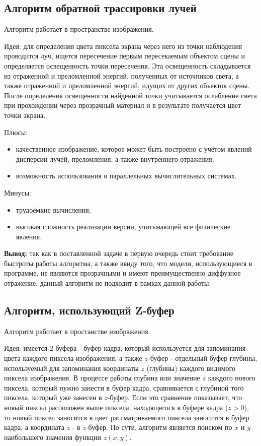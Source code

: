\subsection{Алгоритм обратной трассировки лучей}
Алгоритм работает в пространстве изображения.

Идея: для определения цвета пиксела экрана через него из точки наблюдения проводится луч, ищется пересечение первым пересекаемым объектом сцены и определяется освещенность точки пересечения. Эта освещенность складывается из отраженной и преломленной энергий, полученных от источников света, а также отраженной и преломленной энергий, идущих от других объектов сцены. После определения освещенности найденной точки учитывается ослабление света при прохождении через прозрачный материал и в результате получается цвет точки экрана.

Плюсы:
\begin{itemize}
    \item качественное изображение, которое может быть построено с учётом явлений дисперсии лучей, преломления, а также внутреннего отражения;
    \item возможность использования в параллельных вычислительных системах.
\end{itemize}

Минусы:
\begin{itemize}
    \item трудоёмкие вычисления;
    \item высокая сложность реализации версии, учитывающей все физические явления.
\end{itemize}

\textbf{Вывод:} так как в поставленной задаче в первую очередь стоит требование быстроты работы алгоритма, а также ввиду того, что модели, использующиеся в программе, не являются прозрачными и имеют преимущественно диффузное отражение, данный алгоритм не подходит в рамках данной работы.

\subsection{Алгоритм, использующий Z-буфер}
Алгоритм работает в простанстве изображения.

Идея: имеется 2 буфера - буфер кадра, который используется для запоминания цвета каждого пиксела изображения, а также $z$-буфер - отдельный буфер глубины, используемый для запоминания координаты $z$ (глубины) каждого видимого пиксела изображения. В процессе работы глубина или значение $z$ каждого нового пиксела, который нужно занести в буфер кадра, сравнивается с глубиной того пиксела, который уже занесен в $z$-буфер. Если это сравнение показывает, что новый пиксел расположен выше пиксела, находящегося в буфере кадра ($z > 0$), то новый пиксел заносится в цвет рассматриваемого пиксела заносится в буфер кадра, а координата $z$ - в $z$-буфер. По сути, алгоритм является поиском по $x$ и $y$ наибольшего значения функции $z(x, y)$.

